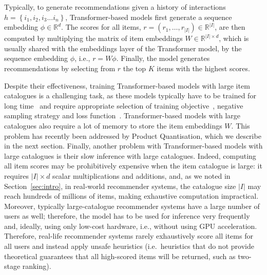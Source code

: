 \documentclass[sigconf,natbib=true, review=False]{acmart} %
\newcommand{\gsasha}[1]{\textcolor[HTML]{000000}{#1}}
\newcommand{\argmax}{\operatornamewithlimits{\sf argmax}}
\begin{document}
 Typically, to generate recommendations given a history of interactions $h = \left\{i_1, i_2, i_3 ... i_n\right\}$, Transformer-based models first generate a sequence embedding $\phi \in \mathbb{R}^d$.
The scores for all items, $r = (r_1, \ldots, r_{|I|}) \in \mathbb{R}^{|I|}$, are then computed by multiplying the matrix of item embeddings $W \in \mathbb{R}^{|I|\times d}$, which is usually shared with the embeddings layer of the Transformer model, by the sequence embedding $\phi$, i.e., $r = W\phi$.
%
Finally, the model generates recommendations by selecting \gsasha{from} $r$ the top $K$ items with the highest scores.%

Despite their effectiveness, training Transformer-based models with large item catalogues is a challenging task, as these models typically have to be trained for long time~\cite{Bert4RecRepro} and require appropriate selection of training objective~\cite{petrovRSSEffectiveEfficient2025}, negative sampling strategy and loss function~\cite{petrovGSASRecReducingOverconfidence2023,klenitskiyTurningDrossGold2023}.
%
Transformer-based models with large catalogues also require a lot of memory to store the item embeddings $W$. This problem has recently been addressed by Product Quantisation, which we describe in the next section. 
%
Finally, another problem with Transformer-based models with large catalogues is their slow inference with large catalogues. Indeed, computing all item scores 
may be prohibitively expensive when the item catalogue is large: it requires $|I|\times d$ scalar multiplications and additions, and, as we noted in Section~\ref{sec:intro},  in real-world recommender systems, the catalogue size $|I|$ may reach hundreds of millions of items, making exhaustive computation 
impractical. Moreover, typically large-catalogue recommender systems have a large number of users as well; therefore, the model has to be used for inference very frequently and, ideally, using only low-cost hardware, i.e., without using GPU acceleration. Therefore, real-life recommender systems rarely exhaustively score all items for all users and instead apply unsafe heuristics (i.e.\ heuristics that do not provide theoretical guarantees that all high-scored items will be returned, such as two-stage ranking). 
 
\end{document}
